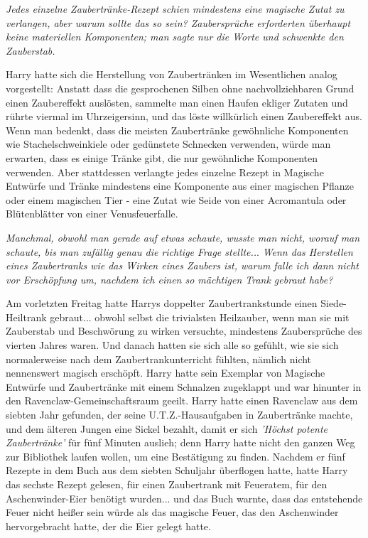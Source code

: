 \emph{Jedes einzelne Zaubertränke-Rezept schien mindestens eine magische Zutat
zu verlangen, aber warum sollte das so sein? Zaubersprüche erforderten überhaupt
keine materiellen Komponenten; man sagte nur die Worte und schwenkte den
Zauberstab.}

Harry hatte sich die Herstellung von Zaubertränken im Wesentlichen analog
vorgestellt: Anstatt dass die gesprochenen Silben ohne nachvollziehbaren Grund
einen Zaubereffekt auslösten, sammelte man einen Haufen ekliger Zutaten und
rührte viermal im Uhrzeigersinn, und das löste willkürlich einen Zaubereffekt
aus. Wenn man bedenkt, dass die meisten Zaubertränke gewöhnliche Komponenten wie
Stachelschweinkiele oder gedünstete Schnecken verwenden, würde man erwarten,
dass es einige Tränke gibt, die nur gewöhnliche Komponenten verwenden. Aber
stattdessen verlangte jedes einzelne Rezept in Magische Entwürfe und Tränke
mindestens eine Komponente aus einer magischen Pflanze oder einem magischen Tier
- eine Zutat wie Seide von einer Acromantula oder Blütenblätter von einer
Venusfeuerfalle.

\emph{Manchmal, obwohl man gerade auf etwas schaute, wusste man nicht, worauf
man schaute, bis man zufällig genau die richtige Frage stellte..}. \emph{Wenn
das Herstellen eines Zaubertranks wie das Wirken eines Zaubers ist, warum falle
ich dann nicht vor Erschöpfung um, nachdem ich einen so mächtigen Trank gebraut
habe?}

Am vorletzten Freitag hatte Harrys doppelter Zaubertrankstunde einen
Siede-Heiltrank gebraut... obwohl selbst die trivialsten Heilzauber, wenn man
sie mit Zauberstab und Beschwörung zu wirken versuchte, mindestens Zaubersprüche
des vierten Jahres waren. Und danach hatten sie sich alle so gefühlt, wie sie
sich normalerweise nach dem Zaubertrankunterricht fühlten, nämlich nicht
nennenswert magisch erschöpft. Harry hatte sein Exemplar von Magische Entwürfe
und Zaubertränke mit einem Schnalzen zugeklappt und war hinunter in den
Ravenclaw-Gemeinschaftsraum geeilt. Harry hatte einen Ravenclaw aus dem siebten
Jahr gefunden, der seine U.T.Z.-Hausaufgaben in Zaubertränke machte, und dem
älteren Jungen eine Sickel bezahlt, damit er sich \emph{'Höchst potente
Zaubertränke'} für fünf Minuten auslieh; denn Harry hatte nicht den ganzen Weg
zur Bibliothek laufen wollen, um eine Bestätigung zu finden. Nachdem er fünf
Rezepte in dem Buch aus dem siebten Schuljahr überflogen hatte, hatte Harry das
sechste Rezept gelesen, für einen Zaubertrank mit Feueratem, für den
Aschenwinder-Eier benötigt wurden... und das Buch warnte, dass das entstehende
Feuer nicht heißer sein würde als das magische Feuer, das den Aschenwinder
hervorgebracht hatte, der die Eier gelegt hatte.


